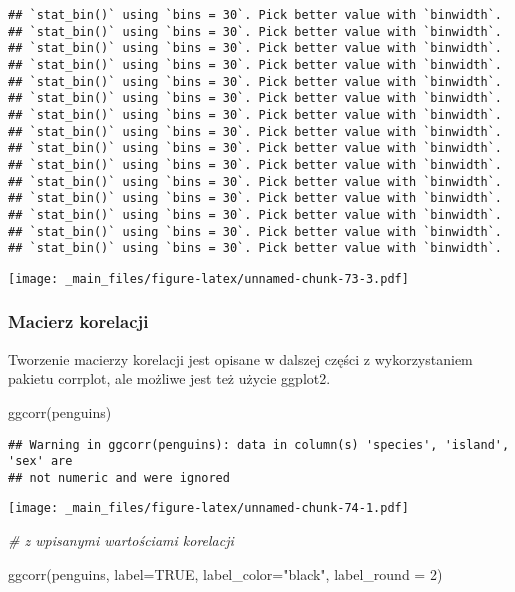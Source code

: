 \documentclass[
]{book}
\newenvironment{Shaded}{\begin{snugshade}}{\end{snugshade}}
\newcommand{\AttributeTok}[1]{\textcolor[rgb]{0.77,0.63,0.00}{#1}}
\newcommand{\CommentTok}[1]{\textcolor[rgb]{0.56,0.35,0.01}{\textit{#1}}}
\newcommand{\ConstantTok}[1]{\textcolor[rgb]{0.00,0.00,0.00}{#1}}
\newcommand{\DecValTok}[1]{\textcolor[rgb]{0.00,0.00,0.81}{#1}}
\newcommand{\FunctionTok}[1]{\textcolor[rgb]{0.00,0.00,0.00}{#1}}
\newcommand{\NormalTok}[1]{#1}
\newcommand{\StringTok}[1]{\textcolor[rgb]{0.31,0.60,0.02}{#1}}
\begin{document}
\begin{verbatim}
## `stat_bin()` using `bins = 30`. Pick better value with `binwidth`.
## `stat_bin()` using `bins = 30`. Pick better value with `binwidth`.
## `stat_bin()` using `bins = 30`. Pick better value with `binwidth`.
## `stat_bin()` using `bins = 30`. Pick better value with `binwidth`.
## `stat_bin()` using `bins = 30`. Pick better value with `binwidth`.
## `stat_bin()` using `bins = 30`. Pick better value with `binwidth`.
## `stat_bin()` using `bins = 30`. Pick better value with `binwidth`.
## `stat_bin()` using `bins = 30`. Pick better value with `binwidth`.
## `stat_bin()` using `bins = 30`. Pick better value with `binwidth`.
## `stat_bin()` using `bins = 30`. Pick better value with `binwidth`.
## `stat_bin()` using `bins = 30`. Pick better value with `binwidth`.
## `stat_bin()` using `bins = 30`. Pick better value with `binwidth`.
## `stat_bin()` using `bins = 30`. Pick better value with `binwidth`.
## `stat_bin()` using `bins = 30`. Pick better value with `binwidth`.
## `stat_bin()` using `bins = 30`. Pick better value with `binwidth`.
\end{verbatim}

\texttt{[image: \_main\_files/figure-latex/unnamed-chunk-73-3.pdf]}

\hypertarget{macierz-korelacji}{%
\subsubsection{Macierz korelacji}\label{macierz-korelacji}}

Tworzenie macierzy korelacji jest opisane w dalszej części z wykorzystaniem pakietu corrplot, ale możliwe jest też użycie ggplot2.

\begin{Shaded}
\begin{Highlighting}[]
\FunctionTok{ggcorr}\NormalTok{(penguins)}
\end{Highlighting}
\end{Shaded}

\begin{verbatim}
## Warning in ggcorr(penguins): data in column(s) 'species', 'island', 'sex' are
## not numeric and were ignored
\end{verbatim}

\texttt{[image: \_main\_files/figure-latex/unnamed-chunk-74-1.pdf]}

\begin{Shaded}
\begin{Highlighting}[]
\CommentTok{\# z wpisanymi wartościami korelacji}

\FunctionTok{ggcorr}\NormalTok{(penguins, }\AttributeTok{label=}\ConstantTok{TRUE}\NormalTok{, }\AttributeTok{label\_color=}\StringTok{"black"}\NormalTok{, }\AttributeTok{label\_round =} \DecValTok{2}\NormalTok{)}
\end{Highlighting}
\end{Shaded}
\end{document}

